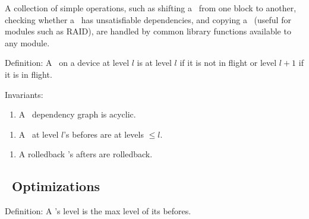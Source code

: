 
A collection of simple operations, such as shifting a \chdesc\ from one block to another,
 checking whether a \chdesc\ has unsatisfiable dependencies, and copying a
 \chdesc\ (useful for modules such as RAID),
are handled by common library functions available to any module.


\noindent Definition: A \chdesc\ on a device at level $l$ is at level $l$
if it is not in flight or level $l+1$ if it is in flight.

\newcommand{\chdescinvar}[1]{\begin{enumerate}\setcounter{enumi}{\value{chdescinvari}}\item #1\setcounter{chdescinvari}{\value{enumi}}\end{enumerate}}

\noindent Invariants:
\chdescinvar{A \chdesc\ dependency graph is acyclic.}

\chdescinvar{A \chdesc\ at level $l$'s befores are at levels $\leq l$.}

\chdescinvar{A rolledback \chdesc{}'s afters are rolledback.}

\subsection{\ChDesc\ Optimizations}

Definition: A \noop{}'s level is the max level of its befores.

